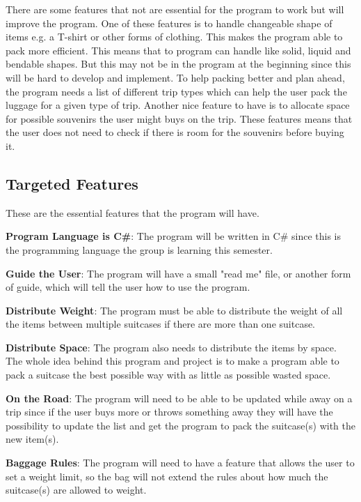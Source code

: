 There are some features that not are essential for the program to work but will improve the program. 
One of these features is to handle changeable shape of items e.g. a T-shirt or other forms of clothing. This makes the program able to pack more efficient. This means that to program can handle like solid, liquid and bendable shapes. But this may not be in the program at the beginning since this will be hard to develop and implement.
To help packing better and plan ahead, the program needs a list of different trip types which can help the user pack the luggage for a given type of trip.
Another nice feature to have is to allocate space for possible souvenirs the user might buys on the trip. These features means that the user does not need to check if there is room for the souvenirs before buying it.

\subsection{Targeted Features}
These are the essential features that the program will have.\newline

\textbf{Program Language is C\#}:
The program will be written in C\# since this is the programming language the group is learning this semester.
\newline

\textbf{Guide the User}:
The program will have a small "read me" file, or another form of guide, which will tell the user how to use the program.
\newline

\textbf{Distribute Weight}:
The program must be able to distribute the weight of all the items between multiple suitcases if there are more than one suitcase.
\newline

\textbf{Distribute Space}:
The program also needs to distribute the items by space. The whole idea behind this program and project is to make a program able to pack a suitcase the best possible way with as little as possible wasted space.
\newline

\textbf{On the Road}:
The program will need to be able to be updated while away on a trip since if the user buys more or throws something away they will have the possibility to update the list and get the program to pack the suitcase(s) with the new item(s).
\newline

\textbf{Baggage Rules}:
The program will need to have a feature that allows the user to set a weight limit, so the bag will not extend the rules about how much the suitcase(s) are allowed to weight.
\newline

